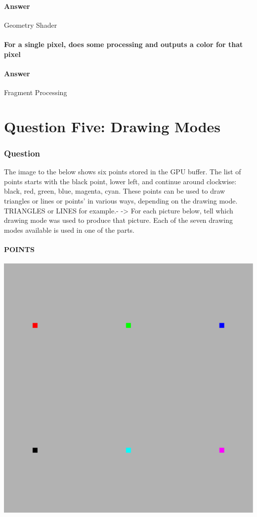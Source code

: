 \documentclass{report}
\begin{document}
\subsection{Answer}
Geometry Shader
\subsection{ For a single pixel, does some processing and outputs a color for that pixel}
\subsection{Answer}
Fragment Processing
\part{Question Five: Drawing Modes}
\section{Question}
The image to the below shows six points stored in the GPU buffer. The list of points starts with the black point, lower left, and continue around clockwise: black, red, green, blue, magenta, cyan. These points can be used to draw triangles or lines or points' in various ways, depending on the drawing mode. TRIANGLES or LINES for example.- -> For each picture below, tell which drawing mode was used to produce that picture. Each of the seven drawing modes available is used in one of the parts.

\subsection{POINTS}
\includegraphics[width=1.0\textwidth]{Image_1}
\end{document}
